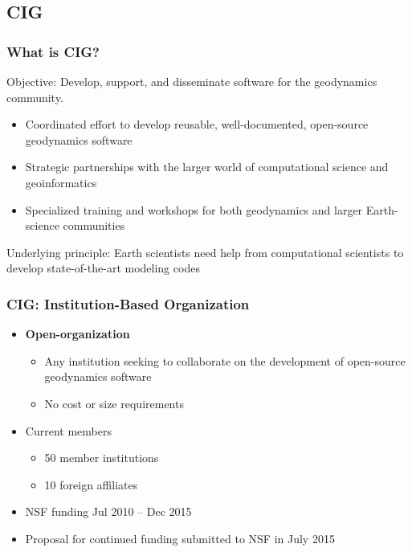 \documentclass{beamer}
\begin{document}
\subsection{CIG}

\begin{frame}
  \frametitle{What is CIG?}
 
  \vfill

  Objective: Develop, support, and disseminate software for the
  geodynamics community.

  \vfill

  \begin{itemize}
  \item Coordinated effort to develop reusable, well-documented,
    open-source geodynamics software
  \item Strategic partnerships with the larger world of
    computational science and geoinformatics
  \item Specialized training and workshops for both geodynamics and
    larger Earth-science communities
  \end{itemize}

  \vfill
 
  Underlying principle: Earth scientists need help from computational
  scientists to develop state-of-the-art modeling codes

\end{frame}


\begin{frame}
  \frametitle{CIG: Institution-Based Organization}
 
  \begin{itemize}
  \item {\bf Open-organization}
    \begin{itemize}
    \item Any institution seeking to collaborate on the development of
      open-source geodynamics software
    \item No cost or size requirements
    \end{itemize}
  \item Current members
    \begin{itemize}
    \item 50 member institutions
    \item 10 foreign affiliates
    \end{itemize}
  \item NSF funding Jul 2010 -- Dec 2015
  \item Proposal for continued funding submitted to NSF in July 2015
 \end{itemize}
\end{frame}
\end{document}
